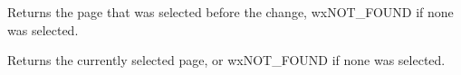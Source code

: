 



\label{wxtreebookeventgetoldselection}


Returns the page that was selected before the change, wxNOT\_FOUND if none was selected.



\label{wxtreebookeventgetselection}


Returns the currently selected page, or wxNOT\_FOUND if none was selected.




